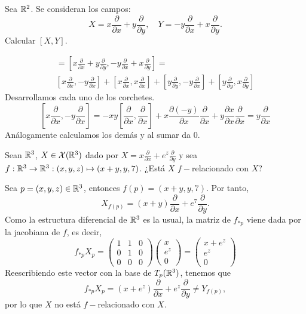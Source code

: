 \documentclass[twoside]{article}
\begin{document}
\begin{ejercicio}{3}
Sea $\mathbb{R}^2$. Se consideran los campos:
\[
X=x\frac{\partial}{\partial x}+y\frac{\partial}{\partial y},\quad Y=-y\frac{\partial}{\partial x}+x\frac{\partial}{\partial y}.
\]
Calcular $[X,Y]$.
\end{ejercicio}
\begin{solucion}
\begin{gather*}
[X,Y]=\left[x\frac{\partial}{\partial x}+y\frac{\partial}{\partial y}, -y\frac{\partial}{\partial x}+x\frac{\partial}{\partial y}\right]=\\
\left[x\frac{\partial}{\partial x},-y\frac{\partial}{\partial x}\right]+\left[x\frac{\partial}{\partial x},x\frac{\partial}{\partial x}\right]+\left[y\frac{\partial}{\partial y},-y\frac{\partial}{\partial x}\right]+\left[y\frac{\partial}{\partial y},x\frac{\partial}{\partial y}\right]
\end{gather*}
Desarrollamos cada uno de los corchetes.
\[
\left[x\frac{\partial}{\partial x},-y\frac{\partial}{\partial x}\right]=-xy\left[\frac{\partial}{\partial x},\frac{\partial}{\partial x}\right]+x\frac{
\partial (-y)}{\partial x}\frac{\partial}{\partial x}+y\frac{\partial x}{\partial x}\frac{\partial}{\partial x}=y\frac{\partial}{\partial x}
\]
Análogamente calculamos los demás y al sumar da 0.
\end{solucion}

\begin{ejercicio}{6}
Sean $\mathbb{R}^3$, $X \in \mathcal{X}(\mathbb{R}^3)$ dado por $X = x\frac{\partial}{\partial x} + e^z\frac{\partial}{\partial y}$ y sea $f :
\mathbb{R}^3 \to \mathbb{R}^3 : (x, y, z) \mapsto (x + y, y, 7)$. ¿Está $X$ $f-$relacionado con $X$?
\end{ejercicio}
\begin{solucion}
Sea $p=(x,y,z)\in\mathbb{R}^3$, entonces $f(p)=(x+y,y,7)$. Por tanto, $$X_{f(p)}=(x+y)\frac{\partial}{\partial x} + e^7\frac{\partial}{\partial y}.$$ %
Como la estructura diferencial de $\mathbb{R}^3$ es la usual, la matriz de $f_{*p}$ viene dada por la jacobiana de $f$, es decir, 
\[f_{*p}X_p=\begin{pmatrix}
1 & 1 & 0\\
0 & 1 & 0\\
0 & 0 & 0
\end{pmatrix}\begin{pmatrix}
x\\
e^z\\
0
\end{pmatrix}=\begin{pmatrix}
x+e^z\\
e^z\\
0
\end{pmatrix}\]
Reescribiendo este vector con la base de $T_p(\mathbb{R}^3)$, tenemos que 
$$f_{*p}X_p=(x+e^z)\frac{\partial}{\partial x} + e^z\frac{\partial}{\partial y}\neq Y_{f(p)},$$
por lo que $X$ no está $f-$relacionado con $X$.
\end{solucion}
\end{document}

